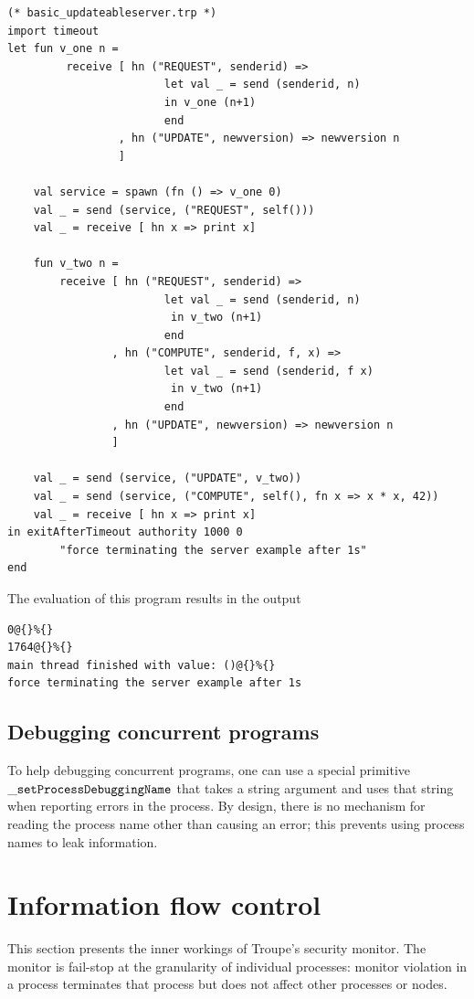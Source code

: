 \begin{lstlisting}
(* basic_updateableserver.trp *)
import timeout
let fun v_one n =
         receive [ hn ("REQUEST", senderid) => 
                        let val _ = send (senderid, n) 
                        in v_one (n+1) 
                        end
                 , hn ("UPDATE", newversion) => newversion n
                 ]
                 
    val service = spawn (fn () => v_one 0)
    val _ = send (service, ("REQUEST", self()))
    val _ = receive [ hn x => print x]
                    
    fun v_two n =
        receive [ hn ("REQUEST", senderid) => 
                        let val _ = send (senderid, n) 
                         in v_two (n+1) 
                        end
                , hn ("COMPUTE", senderid, f, x) =>
                        let val _ = send (senderid, f x)
                         in v_two (n+1)
                        end
                , hn ("UPDATE", newversion) => newversion n
                ]

    val _ = send (service, ("UPDATE", v_two))
    val _ = send (service, ("COMPUTE", self(), fn x => x * x, 42))
    val _ = receive [ hn x => print x]
in exitAfterTimeout authority 1000 0 
		"force terminating the server example after 1s"
end    
\end{lstlisting}
The evaluation of this program results in the output
\begin{verbatim}
0@{}%{}
1764@{}%{}
main thread finished with value: ()@{}%{}
force terminating the server example after 1s
\end{verbatim}

\subsection{Debugging concurrent programs}
To help debugging concurrent programs, one can use a special primitive ${\mathtt{\_setProcessDebuggingName}}$ that
takes a string argument and uses that string when reporting errors in the process. By design, there is no mechanism
for reading the process name other than causing an error; this prevents using process names to leak information.

\section{Information flow control}
\label{sec:infoflow}

This section presents the inner workings of Troupe's security monitor. The monitor is fail-stop at the granularity of individual processes: monitor violation in a process terminates that process but does not affect other processes or nodes.


